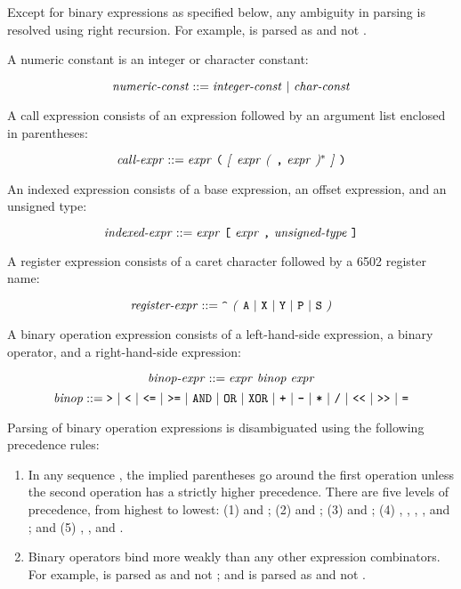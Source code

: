 \documentclass[10pt]{article}
\begin{document}
\noindent
Except for binary expressions as specified below, any ambiguity in
parsing is resolved using right recursion.  For example,  is
parsed as  and not .

  A numeric constant is an integer or
character constant:

$$\mbox{\textit{numeric-const}} ::= \mbox{\ensuremath{\mbox{\textit{integer-const}}} $|$
  \ensuremath{\mbox{\textit{char-const}}}}$$

 A call expression consists of an expression
followed by an argument list enclosed in parentheses:

$$\mbox{\textit{call-expr}} ::= \mbox{\ensuremath{\mbox{\textit{expr}}} \texttt{(}
  \textit{[} \ensuremath{\mbox{\textit{expr}}} \textit{(} \texttt{,} \ensuremath{\mbox{\textit{expr}}} \textit{)}$^*$ \textit{]} \texttt{)}}$$

 An indexed expression consists of a
base expression, an offset expression, and an unsigned type:

$$\mbox{\textit{indexed-expr}} ::= \mbox{\ensuremath{\mbox{\textit{expr}}} \texttt{[}
    \ensuremath{\mbox{\textit{expr}}} \texttt{,} \ensuremath{\mbox{\textit{unsigned-type}}} \texttt{]}}$$

 A register expression consists of a
caret character followed by a 6502 register name:

$$\mbox{\textit{register-expr}} ::= \mbox{\texttt{\textasciicircum} \textit{(} \texttt{A} $|$
    \texttt{X} $|$ \texttt{Y} $|$ \texttt{P} $|$ \texttt{S} \textit{)}}$$

 A binary operation expression
consists of a left-hand-side expression, a binary operator, and a
right-hand-side expression:

$$\mbox{\textit{binop-expr}} ::= \mbox{\ensuremath{\mbox{\textit{expr}}} \ensuremath{\mbox{\textit{binop}}} \ensuremath{\mbox{\textit{expr}}}}$$
%
$$\mbox{\textit{binop}} ::= \mbox{\texttt{>} $|$ \texttt{<} $|$ \texttt{<=} $|$
  \texttt{>=} $|$ \texttt{AND} $|$ \texttt{OR} $|$ \texttt{XOR} $|$ \texttt{+} $|$
  \texttt{-} $|$ \texttt{*} $|$ \texttt{/} $|$ \texttt{<}\texttt{<}~$|$ \texttt{>}\texttt{>}~$|$
  \texttt{=}}$$

\noindent
Parsing of binary operation expressions is disambiguated using the
following precedence rules:

\begin{enumerate}
%
\item In any sequence  
    , the implied
  parentheses go around the first operation unless the second
  operation has a strictly higher precedence.  There are five levels
  of precedence, from highest to lowest: (1) \kwd{<}\kwd{<} and \kwd{>}\kwd{>};
  (2) \kwd{*} and \kwd{\bs}; (3) \kwd{+} and \kwd{-}; (4) \kwd{=},
  \kwd{>}, \kwd{<}, \kwd{<=}, and \kwd{>=}; and (5) ,
  , and .
%
\item Binary operators bind more weakly than any other expression
  combinators.  For example,  is parsed as 
  and not ; and  is parsed as  and
  not .
%
\end{enumerate}
\end{document}
